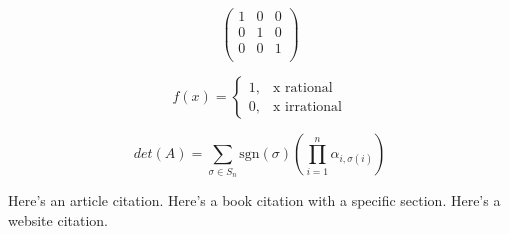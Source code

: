 \documentclass[11pt, reqno]{amsart}
\theoremstyle{plain}
\theoremstyle{definition}
\theoremstyle{example}
\begin{document}
\[\begin{pmatrix}
	1 & 0 & 0 \\ 
	0 & 1 & 0 \\ 
	0 & 0 & 1 \\
\end{pmatrix}\]

\[ f(x) = 
\begin{cases} 
	1, &\text{x rational } \\
	0, &\text{x irrational}	
\end{cases}
\]

\[det(A) = \sum_{\sigma \in S_n}\text{sgn}(\sigma)\left(\prod_{i=1}^n \alpha_{i, \sigma(i)}\right)\]

Here's an article citation. \cite{vershik}
Here's a book citation with a specific section. \cite[\S 1.1]{riehl}
Here's a website citation. \cite{wiki-tensor}

\printbibliography


\end{document}
